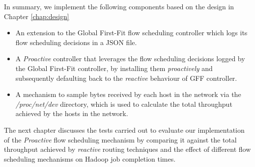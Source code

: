 In summary, we implement the following components based on the design in Chapter \ref{chap:design}
\begin{itemize}
	\item An extension to the Global First-Fit flow scheduling controller which logs its flow scheduling decisions in a JSON file.
	\item A \textit{Proactive} controller that leverages the flow scheduling decisions logged by the Global First-Fit controller, by installing them \textit{proactively} and subsequently defaulting back to the \textit{reactive} behaviour of GFF controller.
	\item A mechanism to sample bytes received by each host in the network via the \textit{/proc/net/dev} directory, which is used to calculate the total throughput achieved by the hosts in the network.   
\end{itemize}


The next chapter discusses the tests carried out to  evaluate our implementation of the \textit{Proactive} flow scheduling mechanism by comparing it against the total throughput achieved by \textit{reactive} routing techniques and the effect of different flow scheduling mechanisms on Hadoop job completion times. 
   